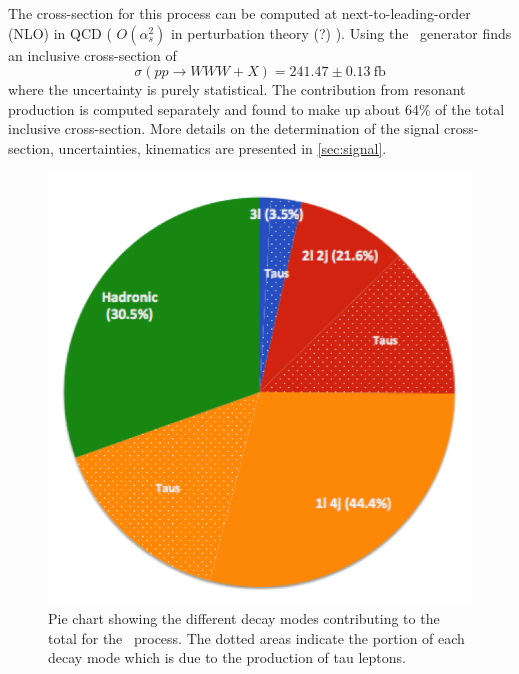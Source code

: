 The cross-section for this process can be computed at 
next-to-leading-order (NLO) in QCD
( $O(\alpha_s^2)$ in perturbation theory (?) ). Using 
the \madgraph~generator finds an inclusive cross-section of 
\begin{equation}
\sigma(pp\rightarrow WWW + X) = 241.47 \pm 0.13~\textrm{fb}
\end{equation}
where the uncertainty is purely statistical.
The contribution from resonant production is computed separately
and found to make up about 64\% of the 
total inclusive cross-section.
More details on the determination of the signal cross-section, uncertainties,
kinematics are presented in \sec\ref{sec:signal}.

\begin{figure}
\centering
\includegraphics[scale=.8]{figures/branching_fractions.png}
\caption{Pie chart showing the different decay modes contributing 
to the total \xsec for the \www~process. 
The dotted areas indicate the portion of each decay 
mode which is due to the production of tau leptons.}
\label{fig:branching_fractions}
\end{figure}

